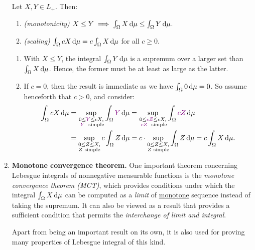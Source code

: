 \begin{enumerate}
\begin{lemma}
\label{lma:leb-int-nonneg-mono-scal}
Let \(X,Y\in L_{+}\). Then:
\begin{enumerate}
\item \emph{(monotonicity)} \(X\le Y\implies \int_{\Omega}^{}X\odif{\mu}\le\int_{\Omega}^{}Y\odif{\mu}\).
\item \emph{(scaling)} \(\int_{\Omega}^{}cX\odif{\mu}=c\int_{\Omega}^{}X\odif{\mu}\) for all \(c\ge 0\).
\end{enumerate}
\end{lemma}
\begin{pf}
\begin{enumerate}
\item With \(X\le Y\), the integral \(\int_{\Omega}^{}Y\odif{\mu}\) is a
supremum over a larger set than \(\int_{\Omega}^{}X\odif{\mu}\). Hence, the
former must be at least as large as the latter.
\item If \(c=0\), then the result is immediate as we have
\(\int_{\Omega}^{}0\odif{\mu}=0\). So assume henceforth that \(c>0\), and
consider:
\begin{align*}
\int_{\Omega}^{}cX\odif{\mu}
&=\sup_{\substack{0\le \vc{Y}\le cX,\\ \text{\vc{\(Y\)} simple}}}
\int_{\Omega}^{}\vc{Y}\odif{\mu}
=\sup_{\substack{0\le \vc{cZ}\le cX,\\ \text{\vc{\(cZ\)} simple}}}
\int_{\Omega}^{}\vc{cZ}\odif{\mu} \\
&=\sup_{\substack{0\le Z\le X,\\ \text{\(Z\) simple}}}
c\int_{\Omega}^{}Z\odif{\mu}
=c\cdot \sup_{\substack{0\le Z\le X,\\ \text{\(Z\) simple}}}
\int_{\Omega}^{}Z\odif{\mu}
=c\int_{\Omega}^{}X\odif{\mu}.
\end{align*}
\end{enumerate}
\end{pf}
\item \textbf{Monotone convergence theorem.} One important theorem concerning
Lebesgue integrals of nonnegative measurable functions is the \emph{monotone
convergence theorem (MCT)}, which provides conditions under which the integral
\(\int_{\Omega}^{}X\odif{\mu}\) can be computed as a \emph{limit} of
\underline{monotone} sequence instead of taking the supremum. It can also be
viewed as a result that provides a sufficient condition that permits the
\emph{interchange of limit and integral}.

Apart from being an important result on its own, it is also used for proving
many properties of Lebesgue integral of this kind.


\end{enumerate}
